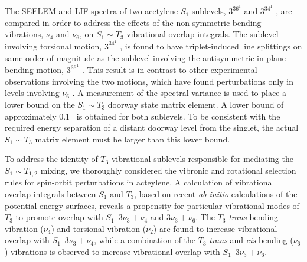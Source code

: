 The SEELEM and LIF spectra of two acetylene $S_1$ sublevels, $3^36^1$
 and $3^34^1$ , are compared in order to address the
effects of the non-symmetric bending vibrations, $\nu_4$ and $\nu_6$,
on $S_1 \sim T_3$ vibrational overlap integrals.  The sublevel
involving torsional motion, $3^34^1$ , is found to have
triplet-induced line splittings on same order of magnitude as the
sublevel involving the antisymmetric in-plane bending motion, $3^36^1$
.  This result is in contrast to other experimental observations
involving the two motions, which have found perturbations only in
levels involving $\nu_6$ \cite{mizoguchi00, yamakita01}.  A
measurement of the spectral variance is used to place a lower bound on
the $S_1 \sim T_3$ doorway state matrix element.  A lower bound of
approximately 0.1 \rcm\ is obtained for both sublevels.  To be
consistent with the required energy separation of a distant doorway
level from the singlet, the actual $S_1 \sim T_3$ matrix element must
be larger than this lower bound.

To address the identity of $T_3$ vibrational sublevels responsible for
mediating the $S_1 \sim T_{1,2}$ mixing, we thoroughly considered the
vibronic and rotational selection rules for spin-orbit perturbations
in acteylene.  A calculation of vibrational overlap integrals between
$S_1$ and $T_3$, based on recent \emph{ab initio} calculations of the
potential energy surfaces, reveals a propensity for particular
vibrational modes of $T_3$ to promote overlap with $S_1 \:\; 3\nu_3 +
\nu_4$ and $3\nu_3 + \nu_6$.  The $T_3$ \emph{trans}-bending
vibration ($\nu_4$) and torsional vibration ($\nu_2$) are found to
increase vibrational overlap with $S_1 \:\; 3\nu_3 + \nu_4$, while a
combination of the $T_3$ \emph{trans} and \emph{cis}-bending ($\nu_6$)
vibrations is observed to increase vibrational overlap with $S_1 \:\;
3\nu_3 + \nu_6$.

